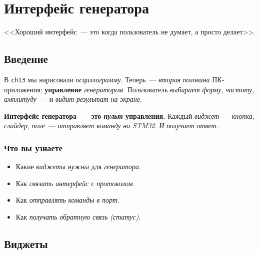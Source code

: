 
\chapter{Интерфейс генератора}
\label{ch:gen-ui}

\epigraph{<<Хороший интерфейс~--- это когда пользователь
не думает, а просто делает>>.}{}

\section{Введение}
\label{sec:gen-ui-intro}

В \texttt{ch13} мы нарисовали \emph{осциллограмму}. Теперь~---
\emph{вторая} \emph{половина} ПК-приложения: \textbf{управление}
\emph{генератором}. Пользователь \emph{выбирает} \emph{форму},
\emph{частоту}, \emph{амплитуду}~--- и \emph{видит} \emph{результат}
\emph{на} \emph{экране}.

\begin{ideabox}
\textbf{Интерфейс генератора~--- это \emph{пульт} управления.}
Каждый \emph{виджет}~--- \emph{кнопка}, \emph{слайдер},
\emph{поле}~--- \emph{отправляет} \emph{команду} \emph{на}
\emph{STM32}. \emph{И} \emph{получает} \emph{ответ}.
\end{ideabox}

\subsection{Что вы узнаете}

\begin{itemize}
    \item Какие \emph{виджеты} \emph{нужны} для \emph{генератора}.
    \item Как \emph{связать} \emph{интерфейс} с \emph{протоколом}.
    \item Как \emph{отправлять} \emph{команды} \emph{в} \emph{порт}.
    \item Как \emph{получать} \emph{обратную} \emph{связь}
          \emph{(статус)}.
\end{itemize}

\section{Виджеты}
\label{sec:gen-ui-widgets}

